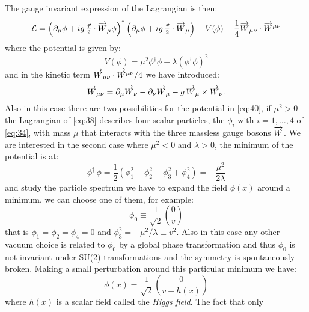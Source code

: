 The gauge invariant expression of the Lagrangian is then:
\begin{equation}
  \label{eq:38}
  \mathcal{L} = \left( \partial_{\mu} \phi + i g\,\tfrac{\vec \tau}{2}
  \cdot \overrightarrow{W}_{\mu} \phi \right)^{\dagger} \left(\partial_{\mu} \phi + i
  g\,\tfrac{\vec \tau}{2} \cdot \overrightarrow{W}_{\mu} \right) - V(\phi) -
  \frac{1}{4} \overrightarrow{W}_{\mu\nu} \cdot \overrightarrow{W}^{\mu\nu}
\end{equation}
where the potential is given by:
\begin{equation}
  \label{Esq:40}
  V(\phi) = \mu^{2} \phi^{\dagger} \phi + \lambda(\phi^{\dagger} \phi)^{2}
\end{equation}
and in the kinetic term $\overrightarrow{W}_{\mu\nu} \cdot \overrightarrow{W}^{\mu\nu}/4$ we have
introduced:
\begin{equation}
  \label{eq:39}
  \overrightarrow{W}_{\mu\nu} = \partial_{\mu} \overrightarrow{W}_{\nu} - \partial_{\nu} \overrightarrow{W}_{\mu}
  - g\,\overrightarrow{W}_{\mu} \times \overrightarrow{W}_{\nu}.
\end{equation}
Also in this case there are two possibilities for the potential in \cref{eq:40},
if $\mu^2 > 0$ the Lagrangian of \cref{eq:38} describes four scalar particles,
the $\phi_i$ with $i = 1, \dots, 4$ of \cref{eq:34}, with mass $\mu$ that
interacts with the three massless gauge bosons $\overrightarrow{W}$. We are interested in
the second case where $\mu^{2} < 0$ and $\lambda > 0$, the minimum of the
potential is at:
\begin{equation}
  \label{eq:40}
  \phi^{\dagger}\,\phi = \frac{1}{2} \left(\phi_{1}^{2} + \phi_{2}^{2} +
    \phi_{3}^{2} + \phi_{4}^{2} \right) = - \frac{\mu^{2}}{2 \lambda}
\end{equation}
and study the particle spectrum we have to expand the field $\phi(x)$ around a
minimum, we can choose one of them, for example:
\begin{equation}
  \label{eq:41}
  \phi_{0} \equiv \frac{1}{\sqrt{2}} \binom{0}{v}
\end{equation}
that is $\phi_{1} = \phi_{2} = \phi_{4} = 0$ and
$\phi_{3}^{2} = - \mu^{2}/\lambda \equiv v^{2}$. Also in this case any other
vacuum choice is related to $\phi_0$ by a global phase transformation and thus
$\phi_0$ is not invariant under SU(2) transformations and the symmetry is
spontaneously broken. Making a small perturbation around this particular minimum
we have:
\begin{equation}
  \label{eq:43}
  \phi (x) = \frac{1}{\sqrt{2}} \binom{0}{v + h(x)}
\end{equation}
where $h(x)$ is a scalar field called the \emph{Higgs field}. The fact that only
